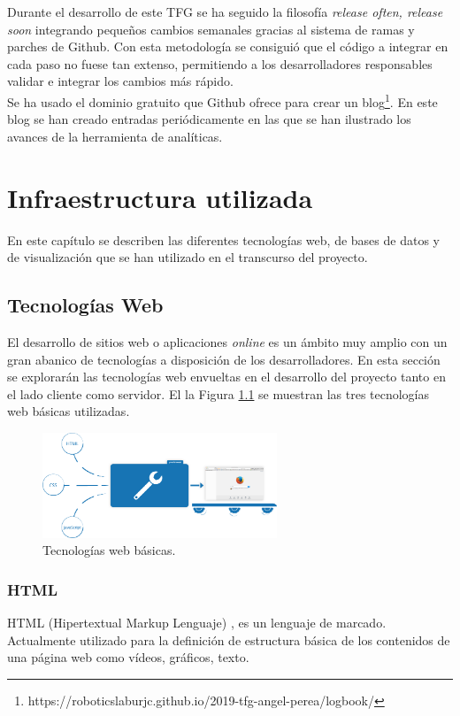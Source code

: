 \documentclass[a4paper, 12pt]{book}
\begin{document}
		Durante el desarrollo de este TFG se ha seguido la filosofía \textit{release often, release soon} integrando pequeños cambios semanales gracias al sistema de ramas y parches de Github. Con esta metodología se consiguió que el código a integrar en cada paso no fuese tan extenso, permitiendo a los desarrolladores responsables validar e integrar los cambios más rápido.\\
		
		Se ha usado el dominio gratuito que Github ofrece para crear un blog\footnote{https://roboticslaburjc.github.io/2019-tfg-angel-perea/logbook/}. En este blog se han creado entradas periódicamente en las que se han ilustrado los avances de la herramienta de analíticas.  
		

		
	\cleardoublepage 
	\chapter{Infraestructura utilizada} 
	\label{chap:infraestructura_utilizada} 
		En este capítulo se describen las diferentes tecnologías web, de bases de datos y de visualización que se han utilizado en el transcurso del proyecto.
		
	\section{Tecnologías Web} 
	\label{sec:tecnologias_web} 
		El desarrollo de sitios web o aplicaciones \textit{online} es un ámbito muy amplio con un gran abanico de tecnologías a disposición de los desarrolladores. En esta sección se explorarán las tecnologías web envueltas en el desarrollo del proyecto tanto en el lado cliente como servidor. El la Figura \ref{fig:HTML_CSS_JS} se muestran las tres tecnologías web básicas utilizadas.
		
		\begin{figure}[H]
			\centering
			\includegraphics[width=7cm, keepaspectratio]{img/html_css_js.png}
			\caption{Tecnologías web básicas.}
			\label{fig:HTML_CSS_JS}
		\end{figure}
	
	\subsection{HTML}
	\label{subsec:html}
		HTML (Hipertextual Markup Lenguaje) \cite{HTML}, es un lenguaje de marcado. Actualmente utilizado para la definición de  estructura básica de los contenidos de una página web como vídeos, gráficos, texto. \\
		
\end{document}
